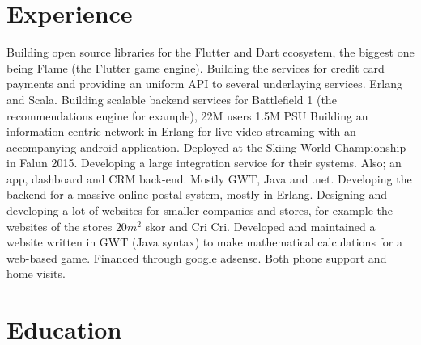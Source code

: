 \documentclass[11pt,a4paper]{moderncv}
\begin{document}
\section{\textbf{Experience}}
{Building open source libraries for the Flutter and Dart ecosystem, the biggest one being Flame (the Flutter game engine).}
{Building the services for credit card payments and providing an uniform API to several underlaying services. Erlang and Scala.}
{Building scalable backend services for Battlefield 1 (the recommendations engine for example), 22M users 1.5M PSU}
{Building an information centric network in Erlang for live video streaming with an accompanying android application.
Deployed at the Skiing World Championship in Falun 2015.}
{Developing a large integration service for their systems. Also; an app, dashboard and CRM back-end. Mostly GWT, Java and .net.}
{Developing the backend for a massive online postal system, mostly in Erlang.}
{Designing and developing a lot of websites for smaller companies and stores, for example the websites of the stores \begin{math}20m^2\end{math} skor and Cri Cri.}
{Developed and maintained a website written in GWT (Java syntax) to make mathematical calculations for a web-based game. Financed through google adsense.}
{Both phone support and home visits.}
\newpage

\section{\textbf{Education}}
\end{document}

